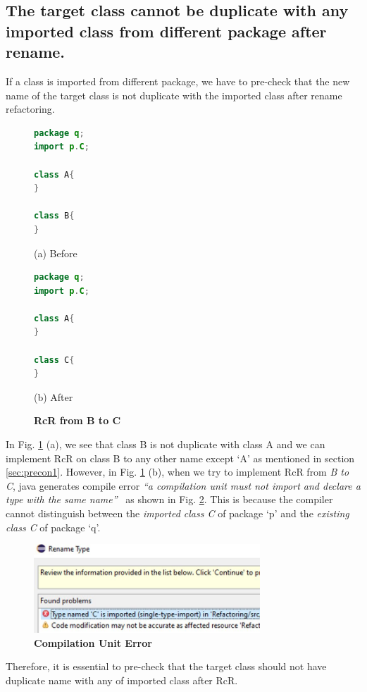 \subsection{The target class cannot be duplicate with any imported class from different package after rename.}

If a class is imported from different package, we have to pre-check that the new name of the target class is not duplicate with the imported class after rename refactoring. 

\begin{figure}[th]
\centering
\begin{minipage}[t]{0.4\linewidth}
\begin{lstlisting}[language=java, basicstyle=\scriptsize\ttfamily,frame=single]
package q;
import p.C;

class A{
}

class B{
} 
\end{lstlisting}
\centering(a) Before
\end{minipage}
\hfill
\begin{minipage}[t]{0.4\linewidth}
\begin{lstlisting}[language=java, basicstyle=\scriptsize\ttfamily,frame=single]
package q;
import p.C;

class A{
}

class C{
} 
\end{lstlisting}
\centering(b) After
\end{minipage}
\caption{\textbf{RcR from B to C}}
\label{figure:fig2}
\end{figure}

In Fig. \ref{figure:fig2} (a), we see that class B is not duplicate with class A and we can implement RcR on class B to any other name except `A' as mentioned in section \ref{sec:precon1}. However, in Fig. \ref{figure:fig2} (b), when we try to implement RcR from \emph{B to C}, java generates compile error \textit{``a compilation unit must not import and declare a type with the same name''}~\cite{EclipseWebPage} as shown in Fig. \ref{figure:comperr}.
This is because the compiler cannot distinguish between the \emph{imported class C} of package `p' and the \emph{existing class C} of package `q'. 

\begin{figure}[H]
\centerline{\includegraphics[width=85mm,scale=0.5]{CUE.jpg}}
\caption{\textbf{Compilation Unit Error} }
\label{figure:comperr}
\end{figure}

Therefore, it is essential to pre-check that the target class should not have duplicate name with any of imported class after RcR.
